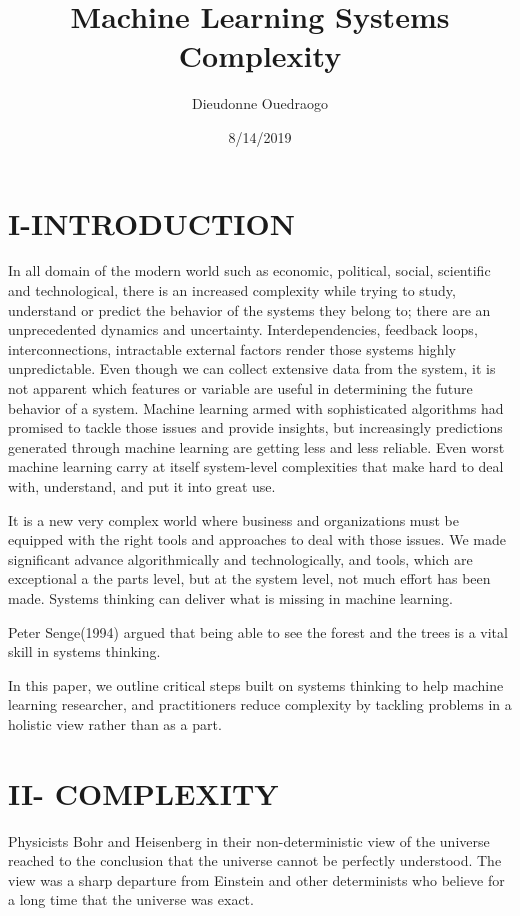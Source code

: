 \documentclass[]{article}
\title{Machine Learning Systems Complexity}
\author{Dieudonne Ouedraogo}
\date{8/14/2019}
\begin{document}
\maketitle

\section{I-INTRODUCTION}\label{i-introduction}

In all domain of the modern world such as economic, political, social,
scientific and technological, there is an increased complexity while
trying to study, understand or predict the behavior of the systems they
belong to; there are an unprecedented dynamics and uncertainty.
Interdependencies, feedback loops, interconnections, intractable
external factors render those systems highly unpredictable. Even though
we can collect extensive data from the system, it is not apparent which
features or variable are useful in determining the future behavior of a
system. Machine learning armed with sophisticated algorithms had
promised to tackle those issues and provide insights, but increasingly
predictions generated through machine learning are getting less and less
reliable. Even worst machine learning carry at itself system-level
complexities that make hard to deal with, understand, and put it into
great use.

It is a new very complex world where business and organizations must be
equipped with the right tools and approaches to deal with those issues.
We made significant advance algorithmically and technologically, and
tools, which are exceptional a the parts level, but at the system level,
not much effort has been made. Systems thinking can deliver what is
missing in machine learning.

Peter Senge(1994) argued that being able to see the forest and the trees
is a vital skill in systems thinking.

In this paper, we outline critical steps built on systems thinking to
help machine learning researcher, and practitioners reduce complexity by
tackling problems in a holistic view rather than as a part.

\section{II- COMPLEXITY}\label{ii--complexity}

Physicists Bohr and Heisenberg in their non-deterministic view of the
universe reached to the conclusion that the universe cannot be perfectly
understood. The view was a sharp departure from Einstein and other
determinists who believe for a long time that the universe was exact.
\end{document}
